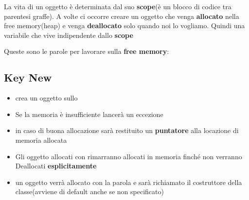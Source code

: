 
La vita di un oggetto è determinata dal suo \textbf{scope}(è un blocco di codice tra parentesi graffe).\newline\newline
A volte ci occorre creare un oggetto che venga \textbf{allocato} nella free memory(heap) e venga \textbf{deallocato} solo quando noi lo vogliamo.\newline\newline
Quindi una variabile che vive indipendente dallo \textbf{scope}
\begin{tcolorbox}[width=\linewidth, boxsep=6pt]
Queste sono le parole \textbf{\code{\textcolor{blue}{chiavi}}} per lavorare sulla \textbf{free memory}:

\end{tcolorbox}

\newpage

\subsection{Key New}
\begin{itemize}
    \item \textcolor{blue}{} crea un oggetto sullo 
    \item Se la memoria è insufficiente lancerà un eccezione 
    \item in caso di buona allocazione sarà restituito un \textbf{puntatore} alla locazione di memoria allocata
    
    \item Gli oggetto allocati con  rimarranno allocati in memoria finché non verranno Deallocati \textbf{esplicitamente}
    
    \item {} un oggetto verrà allocato con la parola  e sarà richiamato il costruttore della classe(avviene di default anche se non specificato)
\end{itemize}

